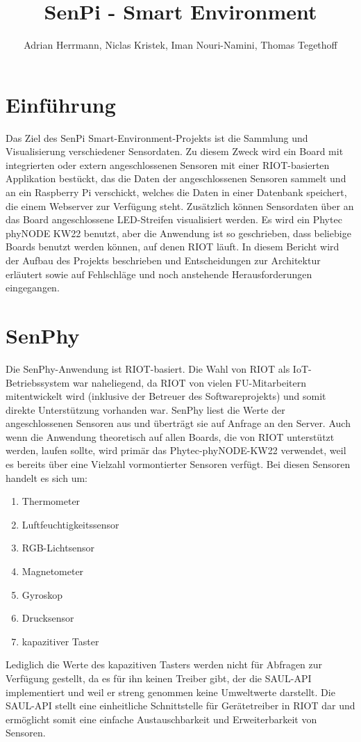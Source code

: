 \documentclass[a4paper]{article}
\title{SenPi - Smart Environment}
\author{Adrian Herrmann, Niclas Kristek, Iman Nouri-Namini, Thomas Tegethoff}
\begin{document}
\maketitle

\section{Einführung}

Das Ziel des SenPi Smart-Environment-Projekts ist die Sammlung und Visualisierung verschiedener Sensordaten. Zu diesem Zweck wird ein Board mit integrierten oder extern angeschlossenen Sensoren mit einer RIOT-basierten Applikation bestückt, das die Daten der angeschlossenen Sensoren sammelt und an ein Raspberry Pi verschickt, welches die Daten in einer Datenbank speichert, die einem Webserver zur Verfügung steht. Zusätzlich können Sensordaten über an das Board angeschlossene LED-Streifen visualisiert werden. Es wird ein Phytec phyNODE KW22 benutzt, aber die Anwendung ist so geschrieben, dass beliebige Boards benutzt werden können, auf denen RIOT läuft. In diesem Bericht wird der Aufbau des Projekts beschrieben und Entscheidungen zur Architektur erläutert sowie auf Fehlschläge und noch anstehende Herausforderungen eingegangen.

\section{SenPhy}
\label{sec:senphy}
Die SenPhy-Anwendung ist RIOT-basiert. Die Wahl von RIOT als IoT-Betriebssystem war naheliegend, da RIOT von vielen FU-Mitarbeitern mitentwickelt wird (inklusive der Betreuer des Softwareprojekts) und somit direkte Unterstützung vorhanden war. SenPhy liest die Werte der angeschlossenen Sensoren aus und überträgt sie auf Anfrage an den Server. Auch wenn die Anwendung theoretisch auf allen Boards, die von RIOT unterstützt werden, laufen sollte, wird primär das Phytec-phyNODE-KW22 verwendet, weil es bereits über eine Vielzahl vormontierter Sensoren verfügt. Bei diesen Sensoren handelt es sich um:
\begin{enumerate}
	\item Thermometer
    \item Luftfeuchtigkeitssensor
    \item RGB-Lichtsensor
    \item Magnetometer
    \item Gyroskop
    \item Drucksensor
    \item kapazitiver Taster
\end{enumerate}
Lediglich die Werte des kapazitiven Tasters werden nicht für Abfragen zur Verfügung gestellt, da es für ihn keinen Treiber gibt, der die SAUL-API implementiert und weil er streng genommen keine Umweltwerte darstellt. Die SAUL-API stellt eine einheitliche Schnittstelle für Gerätetreiber in RIOT dar und ermöglicht somit eine einfache Austauschbarkeit und Erweiterbarkeit von Sensoren.
\end{document}
